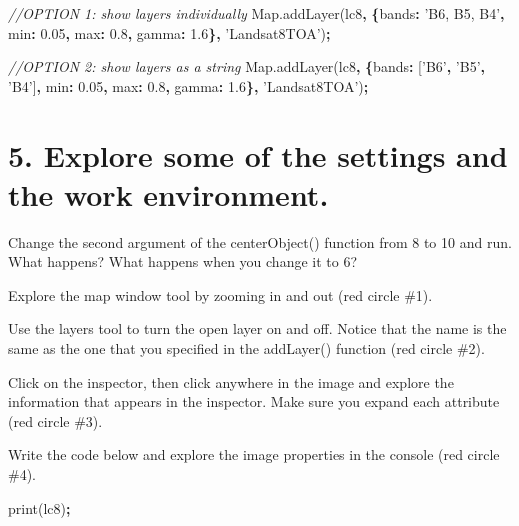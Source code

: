 \documentclass[]{article}
\newenvironment{Shaded}{\begin{snugshade}}{\end{snugshade}}
\newcommand{\AttributeTok}[1]{\textcolor[rgb]{0.77,0.63,0.00}{#1}}
\newcommand{\CommentTok}[1]{\textcolor[rgb]{0.56,0.35,0.01}{\textit{#1}}}
\newcommand{\DataTypeTok}[1]{\textcolor[rgb]{0.13,0.29,0.53}{#1}}
\newcommand{\FloatTok}[1]{\textcolor[rgb]{0.00,0.00,0.81}{#1}}
\newcommand{\NormalTok}[1]{#1}
\newcommand{\OperatorTok}[1]{\textcolor[rgb]{0.81,0.36,0.00}{\textbf{#1}}}
\newcommand{\StringTok}[1]{\textcolor[rgb]{0.31,0.60,0.02}{#1}}
\newcommand{\VariableTok}[1]{\textcolor[rgb]{0.00,0.00,0.00}{#1}}
\begin{document}
\begin{Shaded}
\begin{Highlighting}[]
\CommentTok{//OPTION 1: show layers individually}
\VariableTok{Map}\NormalTok{.}\AttributeTok{addLayer}\NormalTok{(lc8}\OperatorTok{,}
\OperatorTok{\{}\DataTypeTok{bands}\OperatorTok{:} \StringTok{'B6, B5, B4'}\OperatorTok{,} \DataTypeTok{min}\OperatorTok{:} \FloatTok{0.05}\OperatorTok{,} \DataTypeTok{max}\OperatorTok{:} \FloatTok{0.8}\OperatorTok{,} \DataTypeTok{gamma}\OperatorTok{:} \FloatTok{1.6}\OperatorTok{\},} \StringTok{'Landsat8TOA'}\NormalTok{)}\OperatorTok{;}

\CommentTok{//OPTION 2: show layers as a string}
\VariableTok{Map}\NormalTok{.}\AttributeTok{addLayer}\NormalTok{(lc8}\OperatorTok{,}
\OperatorTok{\{}\DataTypeTok{bands}\OperatorTok{:}\NormalTok{ [}\StringTok{'B6'}\OperatorTok{,} \StringTok{'B5'}\OperatorTok{,} \StringTok{'B4'}\NormalTok{]}\OperatorTok{,} \DataTypeTok{min}\OperatorTok{:} \FloatTok{0.05}\OperatorTok{,} \DataTypeTok{max}\OperatorTok{:} \FloatTok{0.8}\OperatorTok{,} \DataTypeTok{gamma}\OperatorTok{:} \FloatTok{1.6}\OperatorTok{\},} \StringTok{'Landsat8TOA'}\NormalTok{)}\OperatorTok{;}
\end{Highlighting}
\end{Shaded}

\hypertarget{explore-some-of-the-settings-and-the-work-environment.}{%
\section{5. Explore some of the settings and the work
environment.}\label{explore-some-of-the-settings-and-the-work-environment.}}

Change the second argument of the centerObject() function from 8 to 10
and run. What happens? What happens when you change it to 6?

Explore the map window tool by zooming in and out (red circle \#1).

Use the layers tool to turn the open layer on and off. Notice that the
name is the same as the one that you specified in the addLayer()
function (red circle \#2).

Click on the inspector, then click anywhere in the image and explore the
information that appears in the inspector. Make sure you expand each
attribute (red circle \#3).

Write the code below and explore the image properties in the console
(red circle \#4).

\begin{Shaded}
\begin{Highlighting}[]
\AttributeTok{print}\NormalTok{(lc8)}\OperatorTok{;}
\end{Highlighting}
\end{Shaded}
\end{document}
